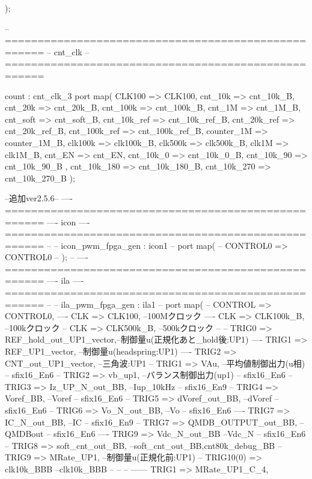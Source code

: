 \begin{mylisting}[language=VHDL,caption=ゲート信号出力モジュール,label=MMC_PWM_GEN_module_VHDL]
			);

-- ====================================================
-- cnt_clk
-- ====================================================

	count : cnt_clk_3
		port map(
			CLK100 => CLK100,
			cnt_10k => cnt_10k_B,
			cnt_20k => cnt_20k_B,
			cnt_100k => cnt_100k_B,
			cnt_1M => cnt_1M_B,
			cnt_soft => cnt_soft_B,
			cnt_10k_ref => cnt_10k_ref_B,
			cnt_20k_ref => cnt_20k_ref_B,
			cnt_100k_ref => cnt_100k_ref_B,
			counter_1M => counter_1M_B,
			clk100k => clk100k_B,
			clk500k => clk500k_B,
			clk1M => clk1M_B,
			cnt_EN => cnt_EN,
			cnt_10k_0 => cnt_10k_0_B,
			cnt_10k_90 => cnt_10k_90_B ,
			cnt_10k_180 => cnt_10k_180_B,
			cnt_10k_270 => cnt_10k_270_B
			);
			
--追加ver2.5.6--
---- ====================================================
---- icon
---- ====================================================
--
--	icon_pwm_fpga_gen : icon1
--		port map(
--			CONTROL0			=>	CONTROL0
--			);
--
---- ====================================================
---- ila
---- ====================================================
--
--	ila_pwm_fpga_gen : ila1
--		port map(
--        CONTROL         =>	CONTROL0,
----			CLK		         =>	CLK100,  	--100Mクロック
----			CLK		         =>	CLK100k_B,  --100kクロック
--			CLK		         =>	CLK500k_B,  --500kクロック
--
--        TRIG0	         =>	REF_hold_out_UP1_vector,--制御量u(正規化あと_hold後:UP1)
----		  TRIG1	         =>	REF_UP1_vector,    		--制御量u(headspring:UP1)
----		  TRIG2	         =>	CNT_out_UP1_vector,     --三角波:UP1   
--		  TRIG1				=> VAu,                    --平均値制御出力(u相)          -- sfix16_En6
--		  TRIG2				=> vb_up1,                 --バランス制御出力(up1)          -- sfix16_En6
--		  TRIG3				=> Iz_UP_N_out_BB,         --Iup_10kHz                 -- sfix16_En9
--		  TRIG4				=> Voref_BB,         	   --Voref                     -- sfix16_En6
--		  TRIG5				=> dVoref_out_BB,         	--dVoref                    -- sfix16_En6
--		  TRIG6				=> Vo_N_out_BB,				--Vo                        -- sfix16_En6
----		  TRIG7				=> IC_N_out_BB,         	--IC                        -- sfix16_En9
--		  TRIG7				=> QMDB_OUTPUT_out_BB,     --QMDBout                   -- sfix16_En6
----		  TRIG9				=> Vdc_N_out_BB         	--Vdc_N                     -- sfix16_En6
--		  TRIG8				=> soft_cnt_out_BB,         --soft_cnt_out_BB,cnt80k_debug_BB           
--		  TRIG9	         =>	MRate_UP1,              --制御量u(正規化前:UP1)
--		  TRIG10(0)			=> clk10k_BBB         	   --clk10k_BBB                
--
--
--
------    TRIG1	         =>	MRate_UP1_C_4,

\end{mylisting}
